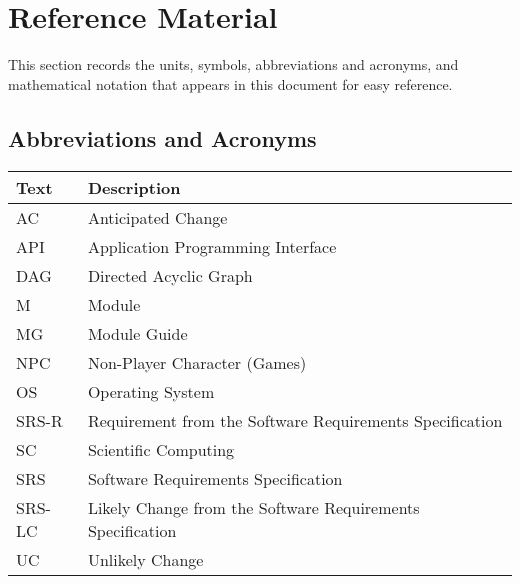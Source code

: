 \section{Reference Material}

This section records the units, symbols, abbreviations and acronyms, and
mathematical notation that appears in this document for easy reference.

\subsection*{Abbreviations and Acronyms}

\begin{center}

    \renewcommand{\arraystretch}{1.2}
    \begin{tabular}{C{0.1\textwidth} m{0.7\textwidth}}
        \toprule
        \textbf{Text} & \textbf{Description} \\
        \midrule

        AC & Anticipated Change \\

        API & Application Programming Interface \\

        DAG & Directed Acyclic Graph \\

        M & Module \\

        MG & Module Guide \\

        NPC & Non-Player Character (Games) \\

        OS & Operating System \\

        SRS-R & Requirement from the Software Requirements Specification \\

        SC & Scientific Computing \\

        SRS & Software Requirements Specification \\

        SRS-LC & Likely Change from the Software
        Requirements Specification \\

        UC & Unlikely Change \\

        \bottomrule
    \end{tabular}

\end{center}
